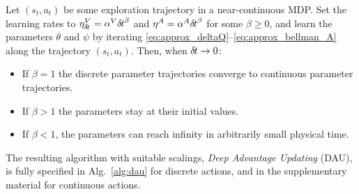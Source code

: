 
\begin{theorem}
	\label{th:cont-params}
Let $(s_t,a_t)$ be some exploration trajectory in a near-continuous MDP. Set the learning rates to $\eta^V_{\delta\hspace{-.1em}t} =
\alpha^V {\delta\hspace{-.1em}t}^\beta$ and $\eta^A = \alpha^A {\delta\hspace{-.1em}t}^\beta$ for some
$\beta\geq 0$, and learn the parameters $\theta$ and $\psi$ by iterating
\eqref{eq:approx_deltaQ}--\eqref{eq:approx_bellman_A} along the
trajectory $(s_t,a_t)$. Then, when
${\delta\hspace{-.1em}t}\to 0$:
	\begin{itemize}
		\item If $\beta = 1$ the discrete parameter trajectories converge to continuous parameter
			trajectories.%
		\item If $\beta>1$ the parameters stay at their initial
		values.
		\item If $\beta < 1$, the parameters can reach infinity
		in arbitrarily small physical time.%
	\end{itemize}
\end{theorem}


The resulting algorithm with suitable scalings,
\emph{Deep Advantage Updating} (DAU), is fully specified in Alg.~\ref{alg:dau} for
discrete actions, and in the supplementary material for continuous
actions.

